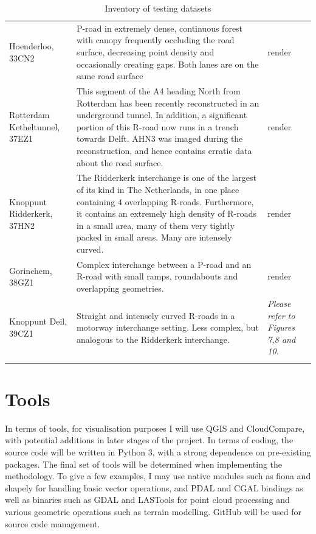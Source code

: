 \begin{longtable}[c]{@{}p{2.6cm}p{7cm}p{6cm}@{}}
Hoenderloo, 33CN2 & P-road in extremely dense, continuous forest with canopy frequently occluding the road surface, decreasing point density and occasionally creating gaps. Both lanes are on the same road surface & render \\
Rotterdam Ketheltunnel, 37EZ1 & This segment of the A4 heading North from Rotterdam has been recently reconstructed in an underground tunnel. In addition, a significant portion of this R-road now runs in a trench towards Delft. AHN3 was imaged during the reconstruction, and hence contains erratic data about the road surface. & render \\
Knoppunt Ridderkerk, 37HN2 & The Ridderkerk interchange is one of the largest of its kind in The Netherlands, in one place containing 4 overlapping R-roads. Furthermore, it contains an extremely high density of R-roads in a small area, many of them very tightly packed in small areas. Many are intensely curved. & render \\
Gorinchem, 38GZ1 & Complex interchange between a P-road and an R-road with small ramps, roundabouts and overlapping geometries. & render \\
Knoppunt Deil, 39CZ1 & Straight and intensely curved R-roads in a motorway interchange setting. Less complex, but analogous to the Ridderkerk interchange. & \textit{Please refer to Figures 7,8 and 10.} \\
\toprule
\caption{Inventory of testing datasets \label{tab:inventory}}
\end{longtable}

\section*{Tools}

In terms of tools, for visualisation purposes I will use QGIS and CloudCompare, with potential additions in later stages of the project. In terms of coding, the source code will be written in Python 3, with a strong dependence on pre-existing packages. The final set of tools will be determined when implementing the methodology. To give a few examples, I may use native modules such as fiona and shapely for handling basic vector operations, and PDAL and CGAL bindings as well as binaries such as GDAL and LASTools for point cloud processing and various geometric operations such as terrain modelling. GitHub will be used for source code management.
